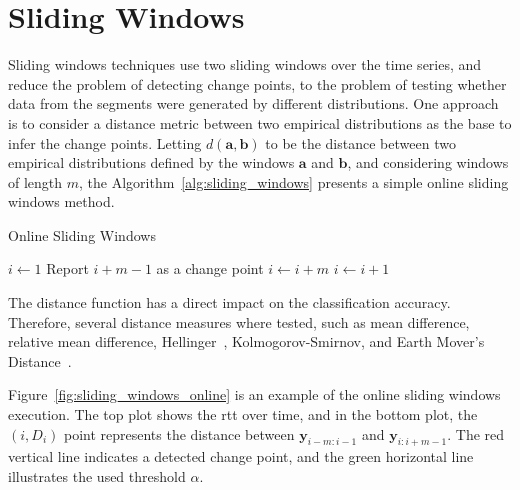 \section{Sliding Windows}

Sliding windows techniques use two sliding windows over the time series, and
reduce the problem of detecting change points, to the problem of testing whether
data from the segments were generated by different distributions. One approach
is to consider a distance metric between two empirical distributions as the base
to infer the change points. Letting $d(\mathbf{a}, \mathbf{b})$ to be the
distance
between two empirical distributions defined by the windows $\mathbf{a}$ and
$\mathbf{b}$, and considering windows of length $m$, the
Algorithm~\ref{alg:sliding_windows} presents a simple online sliding windows
method.

\begin{algorithm}[H]
\caption{Online Sliding Windows}
\label{alg:sliding_windows}
    \begin{algorithmic}[1]
        \State{} $i \gets 1$
                \State{} Report $i + m - 1$ as a change point
                \State{} $i \gets i + m$
             \Else{}
                \State{} $i \gets i + 1$
             \EndIf{}
        \EndWhile{}
    \end{algorithmic}
\end{algorithm}

The distance
function has a direct impact on the classification accuracy.
Therefore, several
distance measures where tested, such as mean difference, relative mean
difference,
Hellinger~\cite{hellinger_distance}, Kolmogorov-Smirnov, and
Earth Mover's
Distance~\cite{the_earth_movers_distance_as_a_metric_for_image_retrieval}.

Figure~\ref{fig:sliding_windows_online} is an example of the online sliding
windows execution. The top plot
shows the \gls*{rtt} over time, and in
the bottom plot, the $(i, D_{i})$ point represents the distance between
$\mathbf{y}_{i - m : i - 1}$ and $\mathbf{y}_{i : i + m - 1}$. The red vertical
line indicates a detected change point, and the green horizontal line
illustrates the used threshold $\alpha$.

